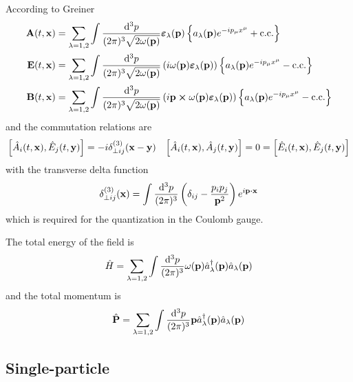 According to Greiner~\cite[p.~196]{Greiner2013}
\begin{align}
	\vb{A}(t,\vb{x})
	&=
	\sum_{\lambda=1,2}
	\int\frac{\dd[3]{p}}{(2\pi)^3\sqrt{2\omega(\vb{p})}}
	\boldsymbol{\varepsilon}_\lambda(\vb{p})
	\left\{
		a_\lambda(\vb{p})
		e^{-ip_\mu x^\mu}
		+
		\text{c.c.}
	\right\}
	\label{eq:qmw_pos}
	\\
	\vb{E}(t,\vb{x})
	&=
	\sum_{\lambda=1,2}
	\int\frac{\dd[3]{p}}{(2\pi)^3\sqrt{2\omega(\vb{p})}}
	\left(
		i\omega(\vb{p})
		\boldsymbol{\varepsilon}_\lambda(\vb{p})
	\right)
	\left\{
		a_\lambda(\vb{p})
		e^{-ip_\mu x^\mu}
		-
		\text{c.c.}
	\right\}
	\label{eq:qmw_mom}
	\\
	\vb{B}(t,\vb{x})
	&=
	\sum_{\lambda=1,2}
	\int\frac{\dd[3]{p}}{(2\pi)^3\sqrt{2\omega(\vb{p})}}
	\left(
		i\vb{p}\cross\omega(\vb{p})
		\boldsymbol{\varepsilon}_\lambda(\vb{p})
	\right)
	\left\{
		a_\lambda(\vb{p})
		e^{-ip_\mu x^\mu}
		-
		\text{c.c.}
	\right\}
	\label{eq:qmw_mag}
\end{align}
and the commutation relations are
\begin{align}
	\comm{\hat{A}_i(t,\vb{x})}{\hat{E}_j(t,\vb{y})}
	=
	-i\delta^{(3)}_{\perp ij}(\vb{x}-\vb{y})
	&&
	\comm{\hat{A}_i(t,\vb{x})}{\hat{A}_j(t,\vb{y})}
	=
	0
	=
	\comm{\hat{E}_i(t,\vb{x})}{\hat{E}_j(t,\vb{y})}
\end{align}
with the transverse delta function
\begin{equation}
	\delta^{(3)}_{\perp ij}(\vb{x})
	=
	\int\frac{\dd[3]{p}}{(2\pi)^3}
	\left(\delta_{ij}-\frac{p_ip_j}{\vb{p}^2}\right)
	e^{i\vb{p}\vdot\vb{x}}
	\label{eq:transverse_delta}
\end{equation}
which is required for the quantization in the Coulomb gauge.

The total energy of the field is
\begin{equation}
	\hat{H}
	=
	\sum_{\lambda=1,2}
	\int\frac{\dd[3]{p}}{(2\pi)^3}
	\omega(\vb{p})
	\hat{a}_\lambda^\dagger(\vb{p})
	\hat{a}_\lambda(\vb{p})
	\label{eq:qmw_total_energy}
\end{equation}
and the total momentum is
\begin{equation}
	\hat{\vb{P}}
	=
	\sum_{\lambda=1,2}
	\int\frac{\dd[3]{p}}{(2\pi)^3}
	\vb{p}
	\hat{a}_\lambda^\dagger(\vb{p})
	\hat{a}_\lambda(\vb{p})
	\label{eq:qmw_total_momentum}
\end{equation}

\subsection{Single-particle}

